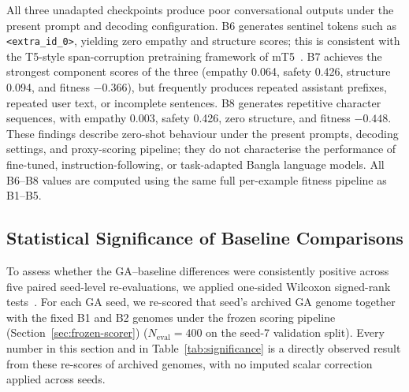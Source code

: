 \documentclass[mathematics,article,submit,xetex,moreauthors]{Definitions/mdpi}
\begin{document}
All three unadapted checkpoints produce poor conversational outputs under the
present prompt and decoding configuration. B6 generates sentinel tokens such as
\texttt{<extra\_id\_0>}, yielding zero empathy and structure scores; this is
consistent with the T5-style span-corruption pretraining framework of
mT5~\cite{mt5_2021}. B7 achieves the strongest component scores of the three
(empathy 0.064, safety 0.426, structure 0.094, and fitness $-0.366$), but
frequently produces repeated assistant prefixes, repeated user text, or
incomplete sentences. B8 generates repetitive character sequences, with
empathy 0.003, safety 0.426, zero structure, and fitness $-0.448$. These findings describe zero-shot behaviour under the
present prompts, decoding settings, and proxy-scoring pipeline; they do not
characterise the performance of fine-tuned, instruction-following, or
task-adapted Bangla language models. All B6--B8 values are computed using the same full per-example fitness pipeline
as B1--B5.

\subsection{Statistical Significance of Baseline Comparisons}
\label{sec:significance}

To assess whether the GA--baseline differences were consistently positive
across five paired seed-level re-evaluations, we applied one-sided Wilcoxon
signed-rank tests~\cite{wilcoxon1945}. For each GA seed, we re-scored that
seed's archived GA genome together with the fixed B1 and B2 genomes under
the frozen scoring pipeline (Section~\ref{sec:frozen-scorer}) ($N_{\mathrm{eval}}=400$ on the
seed-7 validation split). Every number in this section and in
Table~\ref{tab:significance} is a directly observed result from these
re-scores of archived genomes, with no imputed scalar correction applied
across seeds.
\end{document}
